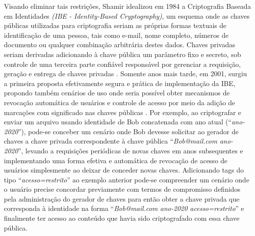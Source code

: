\documentclass[a4paper,11pt]{article}
\begin{document}
Visando eliminar tais restrições, Shamir idealizou em 1984 a Criptografia Baseada em Identidades \emph{(IBE - Identity-Based Cryptography)}, um esquema onde as chaves públicas utilizadas para criptografia seriam as próprias formas textuais de identificação de uma pessoa, tais como e-mail, nome completo, números de documento ou qualquer combinação arbitrária destes dados.
Chaves privadas seriam derivadas adicionando à chave pública um parâmetro fixo e secreto, sob controle de uma terceira parte confiável responsável por gerenciar a requisição, geração e entrega de chaves privadas \cite{Shamir1985}.
Somente anos mais tarde, em 2001, surgiu a primeira proposta efetivamente segura e prática de implementação da IBE, propondo também cenários de uso onde seria possível obter mecanismos de revocação automática de usuários e controle de acesso por meio da adição de marcações com significado nas chaves públicas \cite{Boneh2001}.
Por exemplo, ao criptografar e enviar um arquivo usando identidade de Bob concatenada com ano atual (``\emph{ano-2020}''), pode-se conceber um cenário onde Bob devesse solicitar ao gerador de chaves a chave privada correspondente à chave pública ``\emph{Bob@mail.com ano-2020}'', levando a requisições periódicas de novas chaves em anos subsequentes e implementando uma forma efetiva e automática de revocação de acesso de usuários simplesmente ao deixar de conceder novas chaves.
Adicionando tags do tipo ``\emph{acesso=restrito}'' ao exemplo anterior pode-se compreender um cenário onde o usuário precise concordar previamente com termos de compromisso definidos pela administração do gerador de chaves para então obter a chave privada que corresponda à identidade na forma ``\emph{Bob@mail.com ano-2020 acesso=restrito}'' e finalmente ter acesso ao conteúdo que havia sido criptografado com essa chave pública.
\end{document}
